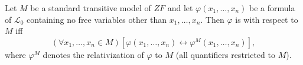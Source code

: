 Let $M$ be a standard transitive model of $ZF$ and let $\varphi(x_1, \ldots, x_n)$ be a formula of $\mathcal{L}_0$ containing no free variables other than $x_1, \ldots, x_n$. Then $\varphi$ is  with respect to $M$ iff
$$(\forall x_1, \ldots, x_n \in M)[\varphi(x_1, \ldots, x_n) \leftrightarrow \varphi^M(x_1, \ldots, x_n)],$$
where $\varphi^M$ denotes the relativization of $\varphi$ to $M$ (all quantifiers restricted to $M$).
